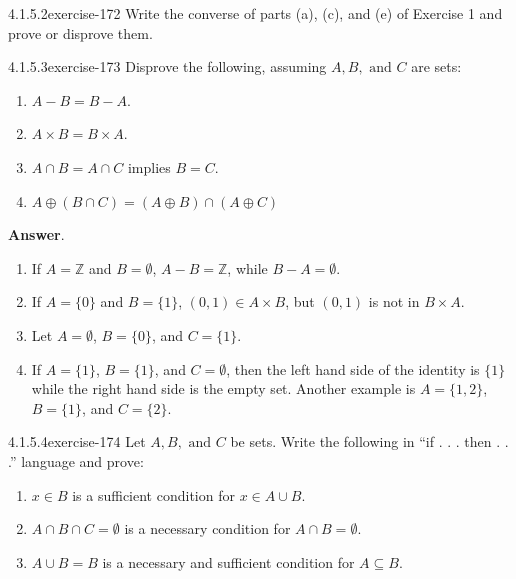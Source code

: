 \documentclass[twoside,10pt,]{book}
\numberwithin{equation}{section}
\begin{document}
\begin{divisionsolution}{4.1.5.2}{}{exercise-172}%
\hypertarget{p-1558}{}%
Write the converse of parts (a), (c), and (e) of Exercise 1 and prove or disprove them.%
\end{divisionsolution}%
\begin{divisionsolution}{4.1.5.3}{}{exercise-173}%
\hypertarget{p-1559}{}%
Disprove the following, assuming \(A, B, \textrm{ and } C\) are sets:\leavevmode%
\begin{enumerate}[label=(\alph*)]
\item\hypertarget{li-828}{}\hypertarget{p-1560}{}%
\(A - B = B - A\).%
\item\hypertarget{li-829}{}\hypertarget{p-1561}{}%
\(A\times B = B\times A\).%
\item\hypertarget{li-830}{}\hypertarget{p-1562}{}%
\(A \cap   B = A  \cap   C\) implies \(B = C\).%
\item\hypertarget{li-831}{}\hypertarget{p-1563}{}%
\(A \oplus  (B\cap C) = (A \oplus  B)\cap  (A \oplus C)\)%
\end{enumerate}
%
\par\smallskip%
\noindent\textbf{Answer}.\quad%
\hypertarget{p-1564}{}%
\leavevmode%
\begin{enumerate}[label=(\alph*)]
\item\hypertarget{li-832}{}\hypertarget{p-1565}{}%
If \(A = \mathbb{Z}\) and \(B=\emptyset\), \(A - B = \pmb{\mathbb{Z}}\), while \(B - A = \emptyset\).%
\item\hypertarget{li-833}{}\hypertarget{p-1566}{}%
If \(A=\{0\}\) and \(B = \{1\}\), \((0,1) \in  A \times  B\), but \((0, 1)\) is not in \(B\times A\).%
\item\hypertarget{li-834}{}\hypertarget{p-1567}{}%
Let \(A = \emptyset\), \(B = \{0\}\), and \(C = \{1\}\).%
\item\hypertarget{li-835}{}\hypertarget{p-1568}{}%
If \(A = \{1\}\), \(B = \{1\}\), and \(C =\emptyset\), then the left hand side of the identity is \(\{1\}\) while the right hand side is the empty set. Another example is \(A = \{1,2\}\), \(B = \{1\}\), and \(C =\{2\}.\)%
\end{enumerate}
%
\end{divisionsolution}%
\begin{divisionsolution}{4.1.5.4}{}{exercise-174}%
\hypertarget{p-1569}{}%
Let \(A, B, \textrm{ and } C\) be sets. Write the following in ``if . . . then . . .'' language and prove:\leavevmode%
\begin{enumerate}[label=(\alph*)]
\item\hypertarget{li-836}{}\hypertarget{p-1570}{}%
\(x \in  B\) is a sufficient condition for \(x \in  A \cup B\).%
\item\hypertarget{li-837}{}\hypertarget{p-1571}{}%
\(A \cap B\cap C = \emptyset\) is a necessary condition for \(A \cap  B =\emptyset\).%
\item\hypertarget{li-838}{}\hypertarget{p-1572}{}%
\(A \cup  B = B\) is a necessary and sufficient condition for \(A\subseteq  B\).%
\end{enumerate}
%
\end{divisionsolution}%
\end{document}

